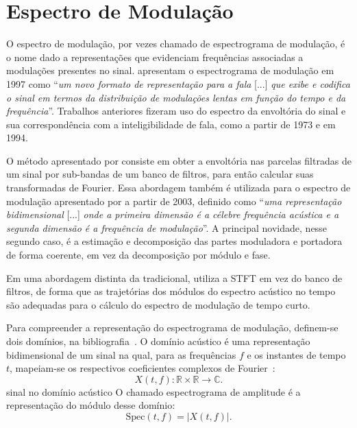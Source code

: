 \section{Espectro de Modulação}

O espectro de modulação, por vezes chamado de espectrograma de modulação, é o
nome dado a representações que evidenciam frequências associadas a modulações
presentes no sinal. \citet{greenberg1997} apresentam o espectrograma de
modulação em 1997 como ``\textit{um novo formato de representação para a fala}
[...] \textit{que exibe e codifica o sinal em termos da distribuição de
modulações lentas em função do tempo e da frequência}''. Trabalhos anteriores
fizeram uso do espectro da envoltória do sinal e sua correspondência com a
inteligibilidade de fala, como \citet{houtgast1973} \citet{houtgast1980}
\cite{houtgast1985} a partir de 1973 e \citet{drullman1994} em 1994.

O método apresentado por \citet{greenberg1997} consiste em obter a envoltória
nas parcelas filtradas de um sinal por sub-bandas de um banco de filtros, para
então calcular suas transformadas de Fourier. Essa abordagem também é utilizada
para o espectro de modulação apresentado por \citet{atlas2004} \cite{atlas2003}
a partir de 2003, definido como ``\textit{uma representação bidimensional} [...]
\textit{onde a primeira dimensão é a  célebre frequência acústica e a segunda
dimensão é a frequência de modulação}''. A principal novidade, nesse segundo
caso, é a estimação e decomposição das partes moduladora e portadora de forma
coerente, em vez da decomposição por módulo e fase.

Em uma abordagem distinta da tradicional,
\citet{paliwal2010}\cite{so2011modulation}\cite{paliwal2012mmse} utiliza a STFT 
em vez do banco de filtros, de forma que as trajetórias dos módulos do espectro
acústico no tempo são adequadas para o cálculo do espectro de modulação de tempo
curto.

Para compreender a representação do espectrograma de modulação, definem-se dois
domínios, na bibliografia~\cite{paliwal2015}. O domínio acústico é uma
representação bidimensional de um sinal na qual, para as frequências $f$ e os
instantes de tempo $t$, mapeiam-se os respectivos coeficientes complexos de
Fourier~\cite{muller2015}:
\begin{equation}
X(t, f): \mathbb{R}  \times  \mathbb{R} \rightarrow \mathbb{C}.
\end{equation}{sinal no domínio acústico}
O chamado espectrograma de  amplitude é a representação do módulo
desse domínio:
\begin{equation}
\mathrm{Spec}(t, f) = \left\lvert X(t, f)\right\rvert.
\end{equation}

